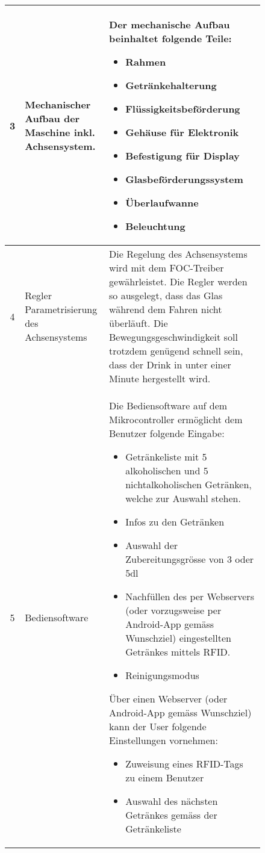 \begin{figure}[H]
\begin{flushleft}
\begin{tabular}{|p{3cm}|p{3.25cm}|p{9.85cm}|}
\multicolumn{1}{|c|}{\cellcolor{green}3} & \cellcolor{green}Mechanischer Aufbau der Maschine inkl. Achsensystem. & \cellcolor{green}Der mechanische Aufbau beinhaltet folgende Teile:

\begin{itemize}
\item Rahmen
\item Getränkehalterung
\item Flüssigkeitsbeförderung
\item Gehäuse für Elektronik
\item Befestigung für Display
\item Glasbeförderungssystem
\item Überlaufwanne
\item Beleuchtung
\end{itemize} \\ \hline

\multicolumn{1}{|c|}{\cellcolor{green}4} & \cellcolor{green}Regler Parametrisierung des Achsensystems & \cellcolor{green}Die Regelung des Achsensystems wird mit dem FOC-Treiber gewährleistet. Die Regler werden so ausgelegt, dass das Glas während dem Fahren nicht überläuft. Die Bewegungsgeschwindigkeit soll trotzdem genügend schnell sein, dass der Drink in unter einer Minute hergestellt wird.\\ \hline

\multicolumn{1}{|c|}{\cellcolor{green}5} & \cellcolor{green}Bediensoftware & \cellcolor{green}Die Bediensoftware auf dem Mikrocontroller ermöglicht dem Benutzer folgende Eingabe:
\begin{itemize}
\item Getränkeliste mit 5 alkoholischen und 5 nichtalkoholischen Getränken, welche zur Auswahl stehen.
\item Infos zu den Getränken
\item Auswahl der Zubereitungsgrösse von 3 oder 5dl
\item Nachfüllen des per Webservers (oder vorzugsweise per Android-App gemäss Wunschziel) eingestellten Getränkes mittels RFID.
\item Reinigungsmodus
\end{itemize} 
Über einen Webserver (oder Android-App gemäss Wunschziel) kann der User folgende Einstellungen vornehmen:
\begin{itemize}
\item Zuweisung eines RFID-Tags zu einem Benutzer
\item Auswahl des nächsten Getränkes gemäss der Getränkeliste
\end{itemize}
		\end{tabular}
	\end{flushleft}
	\label{table:Pflichtziele}
	
\end{figure}

